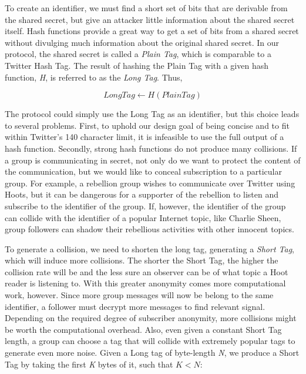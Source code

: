 \documentclass{acm_proc_article-sp}
\begin{document}
To create an identifier, we must find a short set of bits that are derivable from the shared secret, but give an attacker little information about the shared secret itself. Hash functions provide a great way to get a set of bits from a shared secret without divulging much information about the original shared secret. In our protocol, the shared secret is called a \textit{Plain Tag}, which is comparable to a Twitter Hash Tag. The result of hashing the Plain Tag with a given hash function, \textit{H}, is referred to as the \textit{Long Tag}. Thus,

\begin{equation}
	LongTag \leftarrow H(PlainTag)
\end{equation} 

The protocol could simply use the Long Tag as an identifier, but this choice leads to several problems. First, to uphold our design goal of being concise and to fit within Twitter's 140 character limit, it is infeasible to use the full output of a hash function. Secondly, strong hash functions do not produce many collisions. If a group is communicating in secret, not only do we want to protect the content of the communication, but we would like to conceal subscription to a particular group. For example, a rebellion group wishes to communicate over Twitter using Hoots, but it can be dangerous for a supporter of the rebellion to listen and subscribe to the identifier of the group. If, however, the identifier of the group can collide with the identifier of a popular Internet topic, like Charlie Sheen, group followers can shadow their rebellious activities 
with other innocent topics. 

To generate a collision, we need to shorten the long tag, generating a \textit{Short Tag}, which will induce more collisions. The shorter the Short Tag, the higher the collision rate will be and the less sure an observer can be of what topic a Hoot reader is listening to. With this greater anonymity comes more computational work, however. Since more group messages will now be belong to the same identifier, a follower must decrypt more messages to find relevant signal. Depending on the required degree of subscriber anonymity, more collisions might be worth the computational overhead. Also, even given a constant Short Tag length, a group can choose a tag that will collide with extremely popular tags to generate even more noise. Given a Long tag of byte-length \textit{N}, we produce a Short Tag by taking the first \textit{K} bytes of it, such that $K < N$:
\end{document}

